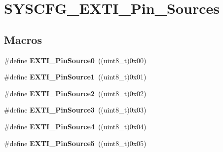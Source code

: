 \hypertarget{group___s_y_s_c_f_g___e_x_t_i___pin___sources}{}\section{S\+Y\+S\+C\+F\+G\+\_\+\+E\+X\+T\+I\+\_\+\+Pin\+\_\+\+Sources}
\label{group___s_y_s_c_f_g___e_x_t_i___pin___sources}
\subsection*{Macros}
\begin{DoxyCompactItemize}
\item 
\hypertarget{group___s_y_s_c_f_g___e_x_t_i___pin___sources_ga85e9f2bccca02c8f63fa5d486bb42393}{}\#define {\bfseries E\+X\+T\+I\+\_\+\+Pin\+Source0}~((uint8\+\_\+t)0x00)\label{group___s_y_s_c_f_g___e_x_t_i___pin___sources_ga85e9f2bccca02c8f63fa5d486bb42393}

\item 
\hypertarget{group___s_y_s_c_f_g___e_x_t_i___pin___sources_gadc4c0152b4bd194f872061c03cc9f5d5}{}\#define {\bfseries E\+X\+T\+I\+\_\+\+Pin\+Source1}~((uint8\+\_\+t)0x01)\label{group___s_y_s_c_f_g___e_x_t_i___pin___sources_gadc4c0152b4bd194f872061c03cc9f5d5}

\item 
\hypertarget{group___s_y_s_c_f_g___e_x_t_i___pin___sources_ga6306a0c8e41b63c45387146670e63fbd}{}\#define {\bfseries E\+X\+T\+I\+\_\+\+Pin\+Source2}~((uint8\+\_\+t)0x02)\label{group___s_y_s_c_f_g___e_x_t_i___pin___sources_ga6306a0c8e41b63c45387146670e63fbd}

\item 
\hypertarget{group___s_y_s_c_f_g___e_x_t_i___pin___sources_ga3c1315cbd350e6da814124d523657202}{}\#define {\bfseries E\+X\+T\+I\+\_\+\+Pin\+Source3}~((uint8\+\_\+t)0x03)\label{group___s_y_s_c_f_g___e_x_t_i___pin___sources_ga3c1315cbd350e6da814124d523657202}

\item 
\hypertarget{group___s_y_s_c_f_g___e_x_t_i___pin___sources_gad540175ce80056822bd017d03fe64bb7}{}\#define {\bfseries E\+X\+T\+I\+\_\+\+Pin\+Source4}~((uint8\+\_\+t)0x04)\label{group___s_y_s_c_f_g___e_x_t_i___pin___sources_gad540175ce80056822bd017d03fe64bb7}

\item 
\hypertarget{group___s_y_s_c_f_g___e_x_t_i___pin___sources_ga95d0ef8a0d250cf48ca1fa7d9787f362}{}\#define {\bfseries E\+X\+T\+I\+\_\+\+Pin\+Source5}~((uint8\+\_\+t)0x05)\label{group___s_y_s_c_f_g___e_x_t_i___pin___sources_ga95d0ef8a0d250cf48ca1fa7d9787f362}


\end{DoxyCompactItemize}
